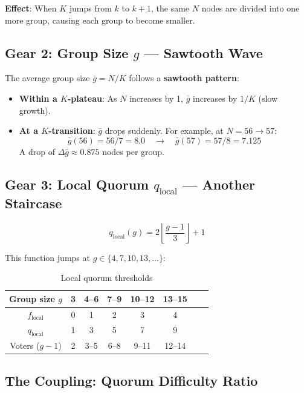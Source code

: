 \documentclass[12pt,a4paper]{article}
\begin{document}
\textbf{Effect}: When $K$ jumps from $k$ to $k+1$, the same $N$ nodes are divided into one more group, causing each group to become smaller.

\subsection{Gear 2: Group Size $g$ --- Sawtooth Wave}

The average group size $\bar{g} = N/K$ follows a \textbf{sawtooth pattern}:

\begin{itemize}
  \item \textbf{Within a $K$-plateau}: As $N$ increases by 1, $\bar{g}$ increases by $1/K$ (slow growth).
  \item \textbf{At a $K$-transition}: $\bar{g}$ drops suddenly. For example, at $N = 56 \to 57$:
  \[
    \bar{g}(56) = 56/7 = 8.0 \quad \longrightarrow \quad \bar{g}(57) = 57/8 = 7.125
  \]
  A drop of $\Delta \bar{g} \approx 0.875$ nodes per group.
\end{itemize}

\subsection{Gear 3: Local Quorum $q_{\text{local}}$ --- Another Staircase}

\begin{equation}
  q_{\text{local}}(g) = 2\left\lfloor \frac{g-1}{3} \right\rfloor + 1
\end{equation}

This function jumps at $g \in \{4, 7, 10, 13, \ldots\}$:

\begin{table}[H]
\centering
\caption{Local quorum thresholds}
\begin{tabular}{cccccccc}
\toprule
Group size $g$ & 3 & 4--6 & 7--9 & 10--12 & 13--15 \\
\midrule
$f_{\text{local}}$ & 0 & 1 & 2 & 3 & 4 \\
$q_{\text{local}}$ & 1 & 3 & 5 & 7 & 9 \\
Voters ($g-1$) & 2 & 3--5 & 6--8 & 9--11 & 12--14 \\
\bottomrule
\end{tabular}
\end{table}

\subsection{The Coupling: Quorum Difficulty Ratio}
\end{document}
